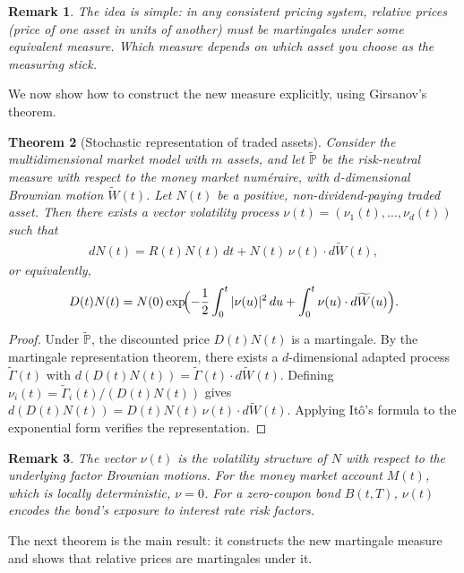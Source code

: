 \documentclass{report}
\theoremstyle{spacedplain}
\newtheorem{theorem}{Theorem}[section]
\theoremstyle{spaceddefinition}
\theoremstyle{spacedremark}
\newtheorem{remark}[theorem]{Remark}
\begin{document}
\begin{remark}
The idea is simple: in any consistent pricing system, relative prices (price of one asset in units of another) must be martingales under some equivalent measure. Which measure depends on which asset you choose as the measuring stick.
\end{remark}

We now show how to construct the new measure explicitly, using Girsanov's theorem.

\begin{theorem}[Stochastic representation of traded assets]
Consider the multidimensional market model with $m$ assets, and let $\widetilde{\mathbb{P}}$ be the risk-neutral measure with respect to the money market num\'eraire, with $d$-dimensional Brownian motion $\widetilde{W}(t)$. Let $N(t)$ be a positive, non-dividend-paying traded asset. Then there exists a vector volatility process $\nu(t) = (\nu_1(t), \ldots, \nu_d(t))$ such that
\begin{align}
    dN(t) = R(t)N(t)\,dt + N(t)\,\nu(t) \cdot d\widetilde{W}(t),
\end{align}
or equivalently,
\begin{align}
    D(t)N(t) = N(0)\exp\!\Bigl(-\frac{1}{2}\int_0^t |\nu(u)|^2\,du + \int_0^t \nu(u) \cdot d\widetilde{W}(u)\Bigr).
\end{align}
\end{theorem}

\begin{proof}
Under $\widetilde{\mathbb{P}}$, the discounted price $D(t)N(t)$ is a martingale. By the martingale representation theorem, there exists a $d$-dimensional adapted process $\widetilde{\Gamma}(t)$ with $d(D(t)N(t)) = \widetilde{\Gamma}(t) \cdot d\widetilde{W}(t)$. Defining $\nu_i(t) = \widetilde{\Gamma}_i(t)/(D(t)N(t))$ gives $d(D(t)N(t)) = D(t)N(t)\,\nu(t) \cdot d\widetilde{W}(t)$. Applying It\^o's formula to the exponential form verifies the representation.
\end{proof}

\begin{remark}
The vector $\nu(t)$ is the volatility structure of $N$ with respect to the underlying factor Brownian motions. For the money market account $M(t)$, which is locally deterministic, $\nu = 0$. For a zero-coupon bond $B(t,T)$, $\nu(t)$ encodes the bond's exposure to interest rate risk factors.
\end{remark}

The next theorem is the main result: it constructs the new martingale measure and shows that relative prices are martingales under it.
\end{document}
